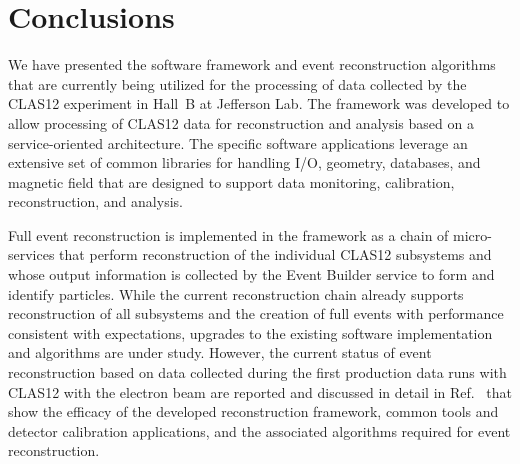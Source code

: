 \section{Conclusions}

We have presented the software framework and event reconstruction algorithms that are currently being utilized
for the processing of data collected by the CLAS12 experiment in Hall~B at Jefferson Lab. The framework was
developed to allow processing of CLAS12 data for reconstruction and analysis based on a service-oriented
architecture. The specific software applications leverage an extensive set of common libraries for handling I/O,
geometry, databases, and magnetic field that are designed to support data monitoring, calibration, reconstruction,
and analysis.

Full event reconstruction is implemented in the framework as a chain of micro-services that perform reconstruction
of the individual CLAS12 subsystems and whose output information is collected by the Event Builder service to form
and identify particles. While the current reconstruction chain already supports reconstruction of all subsystems
and the creation of full events with performance consistent with expectations, upgrades to the existing software
implementation and algorithms are under study. However, the current status of event reconstruction based on
data collected during the first production data runs with CLAS12 with the electron beam are reported and
discussed in detail in Ref.~\cite{clas12-nim} that show the efficacy of the developed reconstruction framework,
common tools and detector calibration applications, and the associated algorithms required for event reconstruction.
